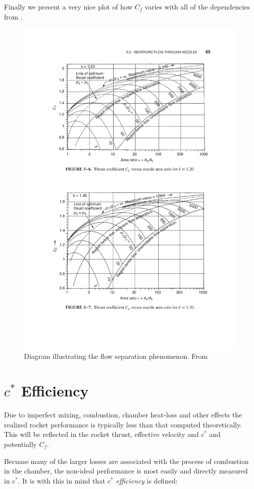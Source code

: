 \documentclass[twocolumn]{memoir} %
\begin{document}
Finally we present a very nice plot of how $C_f$ varies with all of the dependencies
from \cite{sutton}.

\begin{figure}[H]
    \includegraphics[width=0.9\columnwidth]{Cf_sutton}
    \caption{Diagram illustrating the flow separation phenomenon.  From \cite{sutton}}
\end{figure}

\section{$c^*$ Efficiency}
Due to imperfect mixing, combustion, chamber heat-loss and other effects the
realized rocket performance is typically less than that computed theoretically.
This will be reflected in the rocket thrust, effective velocity and $c^*$ and potentially
$C_f$.

Becuase many of the larger losses are associated with the process of combustion
in the chamber, the non-ideal performance is most easily and directly measured in
$c^*$.  It is with this in mind that \emph{$c^*$ efficiency} is defined:
\end{document}
